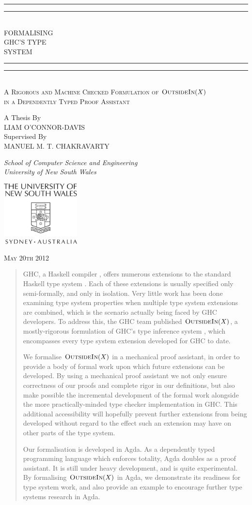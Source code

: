 \documentclass[a4paper]{jfp}
\newlength{\tpheight}\setlength{\tpheight}{0.9\textheight}
\newlength{\txtheight}\setlength{\txtheight}{0.9\tpheight}
\newlength{\tpwidth}\setlength{\tpwidth}{0.9\textwidth}
\newlength{\txtwidth}\setlength{\txtwidth}{0.9\tpwidth}
\newlength{\drop}
\newcommand{\outsidein}{\textsc{OutsideIn}(X)}
\newcommand*{\titleGP}{\begingroup%

\drop=0.1\txtheight
\centering
\vspace*{\baselineskip}
\rule{\txtwidth}{1.6pt}\vspace*{-\baselineskip}\vspace*{2pt}
\rule{\txtwidth}{0.4pt}\\[\baselineskip]
{\LARGE FORMALISING\\ GHC'S TYPE \\[0.3\baselineskip] SYSTEM}\\[0.2\baselineskip]
\rule{\txtwidth}{0.4pt}\vspace*{-\baselineskip}\vspace{3.2pt}
\rule{\txtwidth}{1.6pt}\\[\baselineskip]
\scshape
A Rigorous and Machine Checked Formulation of $\textsc{OutsideIn}(X)$ \\
in a Dependently Typed Proof Assistant \\
\par
\vspace*{2\baselineskip}
A Thesis By \\[\baselineskip]
{\Large LIAM O'CONNOR-DAVIS}
 \\[\baselineskip]
Supervised By \\[\baselineskip]
{\Large MANUEL M. T. CHAKRAVARTY}
 \\[\baselineskip]
{\itshape School of Computer Science and Engineering \\ University of New South Wales \par}
\vfill
\includegraphics[width=4cm]{unswcrest.pdf} \\

\medskip

{\scshape May 20th 2012} \\
\par
\endgroup}
\begin{document}
\pagestyle{empty}
\titleGP
\clearpage
\pagestyle{plain}
\begin{abstract}
GHC, a Haskell compiler \cite{Anonymous:2010we}, offers numerous extensions to the standard Haskell type system \cite{Schrijvers:2009jg, Yorgey:2012:GHP:2103786.2103795, citeulike:9320233, Jones:2007dr}. Each of these extensions is usually specified only semi-formally, and only in isolation. Very little work has been done examining type system properties when multiple type system extensions are combined, which is the scenario actually being faced by GHC developers. To address this, the GHC team published $\outsidein$, a mostly-rigorous formulation of GHC's type inference system \cite{Vytiniotis:2011:OMT:2139531.2139533}, which encompasses every type system extension developed for GHC to date. 

We formalise $\outsidein$ in a mechanical proof assistant, in order to provide a body of formal work upon which future extensions can be developed. By using a mechanical proof assistant we not only ensure correctness of our proofs and complete rigor in our definitions, but also make possible the incremental development of the formal work alongside the more practically-minded type checker implementation in GHC\@. This additional accessibility will hopefully prevent further extensions from being developed without regard to the effect such an extension may have on other parts of the type system.

Our formalisation is developed in Agda\cite{conf/afp/norell08}. As a dependently typed programming language which enforces totality, Agda doubles as a proof assistant\cite{Howard:1980vs}. It is still under heavy development, and is quite experimental. By formalising $\outsidein$ in Agda, we demonstrate its readiness for type system work, and also provide an example to encourage further type systems research in Agda.

\end{abstract}

\tableofcontents
\newpage
\end{document}
